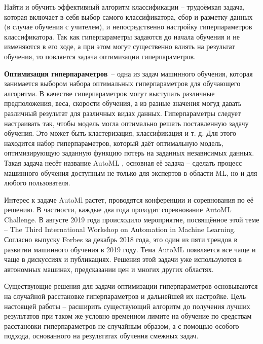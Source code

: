 \documentclass[times,specification,annotation]{itmo-student-thesis}
\begin{document}
	Найти и обучить эффективный алгоритм классификации -- трудоёмкая задача, которая включает в себя выбор самого классификатора, сбор и разметку данных (в случае обучения с учителем), и непосредственно настройку гиперпараметров классификатора. Так как гиперпараметры задаются до начала обучения и не изменяются в его ходе, а при этом могут существенно влиять на результат обучения, то повляется задача оптимизации гиперпараметров. \par
	

	\textbf{Оптимизация гиперпараметров} -- одна из задач машинного обучения, которая занимается выбором набора оптимальных гиперпараметров для обучающего алгоритма. В качестве гиперпараметров могут выступать различные предположения, веса, скорости обучения, а из разные значения могуд давать различный результат для различных видах данных. Гиперпараметры следует настраивать так, чтобы модель могла оптимально решать поставленную задачу обучения. Это может быть кластеризация, классификация и т. д. Для этого находится набор гиперпараметров, который даёт оптимальную модель, оптимизирующую заданную функцию потерь на заданных независимых данных\cite{claesen2015hyperparameter}. Такая задача несёт название AutoML \cite{feurer-automlbook19a}, основная её задача -- сделать процесс машинного обучения доступным не только для экспертов в области ML, но и для любого пользователя. 
	
	Интерес к задаче AutoMl растет, проводятся конференции и соревнования по её решению. В частности, каждые два года проходит соревнование AutoML Challenge. В августе 2019 года происходило мероприятие, посвящённое этой теме -- The Third International Workshop on Automation in Machine Learning\cite{10.1145/3401071}. Согласно выпуску Forbes за декабрь 2018 года, это один из пяти трендов в развитии машинного обучения в 2019 году. Тема AutoML появляется все чаще и чаще в дискуссиях и публикациях. Решения этой задачи уже используются в автономных машинах, предсказании цен и многих других областях.
	
	Существующие решения \cite{lindauer2017warmstarting, HutHooLey10-TR, NIPS2015_5872, falkner-icml-18} для задачи оптимизации гиперпараметров основываются на случайной расстановке гиперпараметров и дальнейшей их настройке. Цель настоящей работы -- расширить существующий алгоритм до получения лучших результатов при таком же условно временном лимите на обучение по средствам расстановки гиперпараметров не случайным образом, а с помощью особого подхода, основанного на результатах обучения смежных задач.\par
\end{document}

